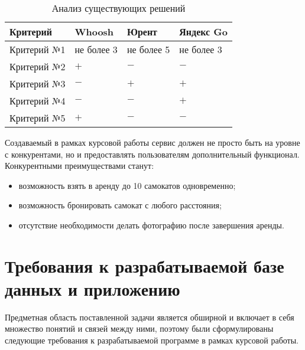 \begin{table}[H]
    \caption{Анализ существующих решений}
    \label{tbl:comparison}
    {\renewcommand{\arraystretch}{1.2}
    \begin{tabularx}{\textwidth} 
        {
            | >{\raggedright\arraybackslash}X 
            | >{\centering\arraybackslash}X 
            | >{\centering\arraybackslash}X 
            | >{\centering\arraybackslash}X |
        }
        \hline
        \textbf{Критерий} & \textbf{Whoosh} & \textbf{Юрент} & \textbf{Яндекс Go}\\
        \hline
        Критерий №1 & не более 3 & не более 5 & не более 3\\
        \hline
        Критерий №2 & $+$ & $-$ & $-$\\
        \hline
        Критерий №3 & $-$ & $+$ & $+$\\
        \hline
        Критерий №4 & $-$ & $-$ & $+$\\
        \hline
        Критерий №5 & $+$ & $-$ & $-$\\
        \hline
    \end{tabularx}}
\end{table}

Создаваемый в рамках курсовой работы сервис должен не просто быть на уровне с конкурентами, но и предоставлять пользователям дополнительный функционал. Конкурентными преимуществами станут:

\begin{itemize}
    \item возможность взять в аренду до 10 самокатов одновременно;
    \item возможность бронировать самокат с любого расстояния;
    \item отсутствие необходимости делать фотографию после завершения аренды.
\end{itemize}

\section{Требования к разрабатываемой базе данных и приложению}

Предметная область поставленной задачи является обширной и включает в себя множество понятий и связей между ними, поэтому были сформулированы следующие требования к разрабатываемой программе в рамках курсовой работы.

